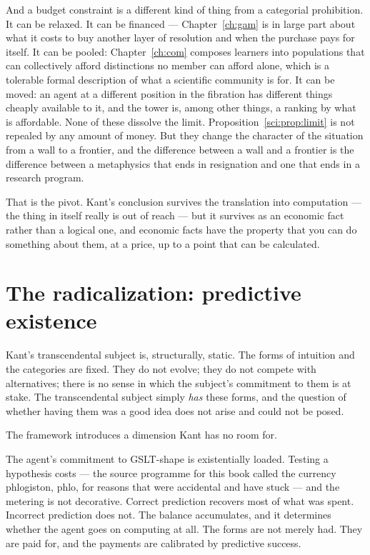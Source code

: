 And a budget constraint is a different kind of thing from a
categorial prohibition.
It can be relaxed.
It can be financed --- Chapter~\ref{ch:gam} is in large part about
what it costs to buy another layer of resolution and when the
purchase pays for itself.
It can be pooled: Chapter~\ref{ch:com} composes learners into
populations that can collectively afford distinctions no member can
afford alone, which is a tolerable formal description of what a
scientific community is for.
It can be moved: an agent at a different position in the fibration
has different things cheaply available to it, and the tower is,
among other things, a ranking by what is affordable.
None of these dissolve the limit.
Proposition~\ref{sci:prop:limit} is not repealed by any amount of
money.
But they change the character of the situation from a wall to a
frontier, and the difference between a wall and a frontier is the
difference between a metaphysics that ends in resignation and one
that ends in a research program.

That is the pivot.
Kant's conclusion survives the translation into computation --- the
thing in itself really is out of reach --- but it survives as an
economic fact rather than a logical one, and economic facts have
the property that you can do something about them, at a price, up
to a point that can be calculated.

\section{The radicalization: predictive existence}
\label{sec:kant-radical}

Kant's transcendental subject is, structurally, static.
The forms of intuition and the categories are fixed.
They do not evolve; they do not compete with alternatives; there is
no sense in which the subject's commitment to them is at stake.
The transcendental subject simply \emph{has} these forms, and the
question of whether having them was a good idea does not arise and
could not be posed.

The framework introduces a dimension Kant has no room for.

The agent's commitment to GSLT-shape is existentially loaded.
Testing a hypothesis costs --- the source programme for this book
called the currency phlogiston, phlo, for reasons that were
accidental and have stuck --- and the metering is not decorative.
Correct prediction recovers most of what was spent.
Incorrect prediction does not.
The balance accumulates, and it determines whether the agent goes
on computing at all.
The forms are not merely had.
They are paid for, and the payments are calibrated by predictive
success.

